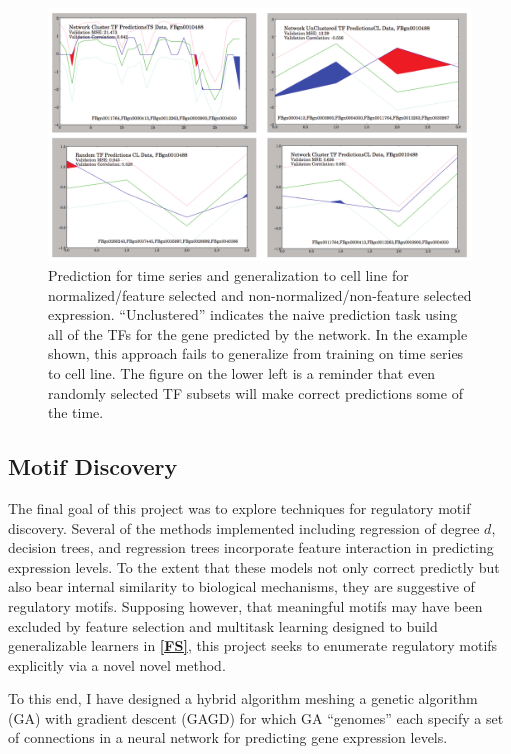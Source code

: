 \documentclass[12pt,a4paper]{article}
\begin{document}
\begin{multicols}{2}
\begin{figure}[h]
\includegraphics[width = 6in]{figs/prediction}
\caption{Prediction for time series and generalization to cell line for normalized/feature selected and non-normalized/non-feature selected expression. ``Unclustered'' indicates the naive prediction task using all of the TFs for the gene predicted by the network. In the example shown, this approach fails to generalize from training on time series to cell line. The figure on the lower left is a reminder that even randomly selected TF subsets will make correct predictions some of the time.}
\label{fig:sample}
\end{figure} 

\subsection{Motif Discovery}\label{selection}

The final goal of this project was to explore techniques for regulatory motif discovery. Several of the methods implemented including regression of degree $d$, decision trees, and regression trees incorporate feature interaction in predicting expression levels. To the extent that these models not only correct predictly but also bear internal similarity to biological mechanisms, they are suggestive of regulatory motifs. Supposing however, that meaningful motifs may have been excluded by feature selection and multitask learning designed to build generalizable learners in \textbf{\ref{FS}}, this project seeks to enumerate regulatory motifs explicitly via a novel novel method.

To this end, I have designed a hybrid algorithm meshing a genetic algorithm (GA) with gradient descent (GAGD) for which GA ``genomes'' each specify a set of connections in a neural network for predicting gene expression levels.


\end{multicols}
\end{document}
